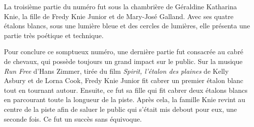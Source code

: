 La troisième partie du numéro fut sous la chambrière de Géraldine Katharina Knie, la fille de Fredy Knie Junior et de Mary-José Galland. Avec ses quatre étalons blancs, sous une lumière bleue et des cercles de lumières, elle présenta une partie très poétique et technique. 

Pour conclure ce somptueux numéro, une dernière partie fut consacrée au cabré de chevaux, qui possède toujours un grand impact sur le public. Sur la musique \textit{Run Free} d’Hans Zimmer, tirée du film \textit{Spirit, l'étalon des plaines} de Kelly Asbury et de Lorna Cook, Fredy Knie Junior fit cabrer un premier étalon blanc tout en tournant autour. Ensuite, ce fut sa fille qui fit cabrer deux étalons blancs en parcourant toute la longueur de la piste. Après cela, la famille Knie revint au centre de la piste afin de saluer le public qui s’était mis debout pour eux, une seconde fois. Ce fut un succès sans équivoque. 


\thispagestyle{empty} %


